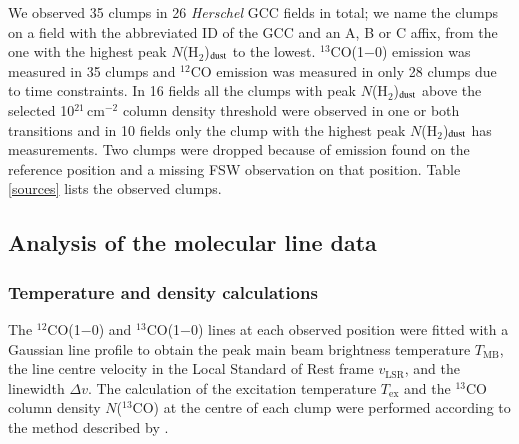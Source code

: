 \documentclass[printer]{aa}
\begin{document}
We observed 35 clumps in 26 \textit{Herschel} GCC fields in total; we name the clumps on a field with the abbreviated ID of the GCC and an A, B or C affix, from the one with the highest peak $N$(H$_2$)$_{\rm dust}$ to the lowest. $^{13}$CO(1$-$0) emission was measured in 35 clumps and $^{12}$CO emission was measured in only 28 clumps due to time constraints. In 16 fields all the clumps with peak $N$(H$_2$)$_{\rm dust}$ above the selected 10$^{21}$\,cm$^{-2}$ column density threshold were observed in one or both transitions and in 10 fields only the clump with the highest peak $N$(H$_2$)$_{\rm dust}$ has measurements. Two clumps were dropped because of emission found on the reference position and a missing FSW observation on that position. Table \ref{sources} lists the observed clumps.

\subsection{Analysis of the molecular line data}

\subsubsection{Temperature and density calculations}
\label{cocalc}

The $^{12}$CO(1$-$0) and $^{13}$CO(1$-$0) lines at each observed position were fitted with a Gaussian line profile to obtain the peak main beam brightness temperature $T\mathrm{_{MB}}$, the line centre velocity in the Local Standard of Rest frame $v\mathrm{_{LSR}}$, and the linewidth $\Delta v$. The calculation of the excitation temperature $T\mathrm{_{ex}}$ and the $^{13}$CO column density $N$($^{13}$CO) at the centre of each clump were performed according to the method described by \citet{rohlfs1996}. 
\end{document}
